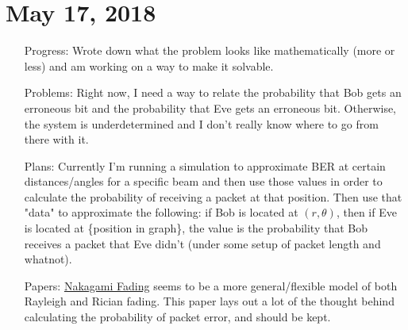 \documentclass[11pt]{article}
\begin{document}
\section{May 17, 2018}
\begin{itemize}
\item[Progress:]
Wrote down what the problem looks like mathematically (more or less) and am working on a way to make it solvable.

\item[Problems:]
Right now, I need a way to relate the probability that Bob gets an erroneous bit and the probability that Eve gets an erroneous bit.  Otherwise, the system is underdetermined and I don't really know where to go from there with it.

\item[Plans:]
Currently I'm running a simulation to approximate BER at certain distances/angles for a specific beam and then use those values in order to calculate the probability of receiving a packet at that position.  Then use that "data" to approximate the following: if Bob is located at $(r,\theta)$, then if Eve is located at \{position in graph\}, the value is the probability that Bob receives a packet that Eve didn't (under some setup of packet length and whatnot).

\item[Papers:]
\href{https://link.springer.com/content/pdf/10.1007\%2F3-540-36087-5_43.pdf}{Nakagami Fading} seems to be a more general/flexible model of both Rayleigh and Rician fading.  This paper lays out a lot of the thought behind calculating the probability of packet error, and should be kept.

\end{itemize}
\newpage
\end{document}
